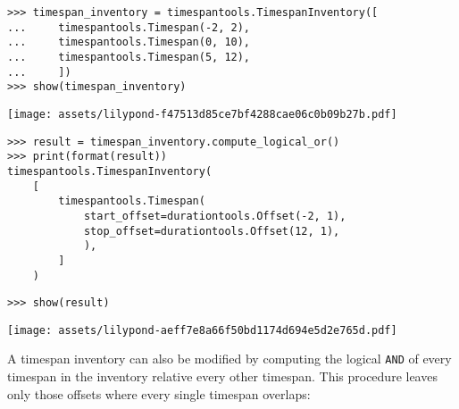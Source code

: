 \begin{comment}
<abjad>
timespan_inventory = timespantools.TimespanInventory([
    timespantools.Timespan(-2, 2),
    timespantools.Timespan(0, 10),
    timespantools.Timespan(5, 12),
    ])
show(timespan_inventory)
result = timespan_inventory.compute_logical_or()
print(format(result))
show(result)
</abjad>
\end{comment}

\begin{abjadbookoutput}
\begin{singlespacing}
\vspace{-0.5\baselineskip}
\begin{lstlisting}
>>> timespan_inventory = timespantools.TimespanInventory([
...     timespantools.Timespan(-2, 2),
...     timespantools.Timespan(0, 10),
...     timespantools.Timespan(5, 12),
...     ])
>>> show(timespan_inventory)
\end{lstlisting}
\noindent\texttt{[image: assets/lilypond-f47513d85ce7bf4288cae06c0b09b27b.pdf]}
\begin{lstlisting}
>>> result = timespan_inventory.compute_logical_or()
>>> print(format(result))
timespantools.TimespanInventory(
    [
        timespantools.Timespan(
            start_offset=durationtools.Offset(-2, 1),
            stop_offset=durationtools.Offset(12, 1),
            ),
        ]
    )
\end{lstlisting}
\begin{lstlisting}
>>> show(result)
\end{lstlisting}
\noindent\texttt{[image: assets/lilypond-aeff7e8a66f50bd1174d694e5d2e765d.pdf]}
\end{singlespacing}
\end{abjadbookoutput}

\noindent A timespan inventory can also be modified by computing the logical
\texttt{AND} of every timespan in the inventory relative every other timespan.
This procedure leaves only those offsets where every single timespan
overlaps:

\begin{comment}
<abjad>
timespan_inventory = timespantools.TimespanInventory([
    timespantools.Timespan(-2, 8),
    timespantools.Timespan(0, 10),
    timespantools.Timespan(5, 12),
    ])
show(timespan_inventory)
result = timespan_inventory.compute_logical_and()
print(format(result))
show(result, range_=(-2, 12))
</abjad>
\end{comment}

